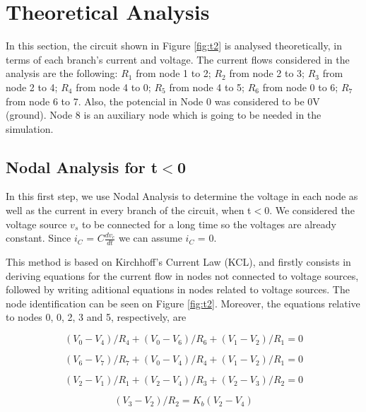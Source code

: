 \section{Theoretical Analysis}
\label{sec:analysis}

In this section, the circuit shown in Figure \ref{fig:t2} is analysed
theoretically, in terms of each branch's current and voltage.
The current flows considered in the analysis are the following:
$R_1$ from node 1 to 2; $R_2$ from node 2 to 3; $R_3$ from node 2 to 4; $R_4$ from node 4 to 0; $R_5$ from node 4 to 5; $R_6$ from node 0 to 6; $R_7$ from node 6 to 7. Also, the potencial in Node 0 was considered to be 0V (ground). Node 8 is an auxiliary node which is going to be needed in the simulation.

\subsection{Nodal Analysis for t$<$0}
\label{sec:na}

In this first step, we use Nodal Analysis to determine the voltage in each node as well as the current in every branch of the circuit, when t$<$0. We considered the voltage source $v_s$ to be connected for a long time so the voltages are already constant. Since $i_C$ = $C$$\frac{dv_c}{dt}$ we can assume $i_C$ = 0. \par 
This method is based on Kirchhoff's Current Law (KCL), and firstly consists in
deriving equations for the current flow in nodes not connected to voltage sources,
followed by writing aditional equations in nodes related to voltage sources. The node 
identification can be seen on Figure \ref{fig:t2}. Moreover, the equations relative to
nodes 0, 0, 2, 3 and 5, respectively, are

\begin{equation}
  (V_0 - V_4)/R_4 + (V_0 - V_6)/R_6 + (V_1 - V_2)/R_1 = 0 
  \label{eq:kvl1}
\end{equation}

\begin{equation}
  (V_6 - V_7)/R_7 + (V_0 - V_4)/R_4 + (V_1 - V_2)/R_1 = 0 
  \label{eq:kvl2}
\end{equation}

\begin{equation}
  (V_2 - V_1)/R_1 + (V_2 - V_4)/R_3 + (V_2 - V_3)/R_2 = 0
  \label{eq:kvl3}
\end{equation}

\begin{equation}
  (V_3 - V_2)/R_2 = K_b(V_2 - V_4)
  \label{eq:kvl4}
\end{equation}

